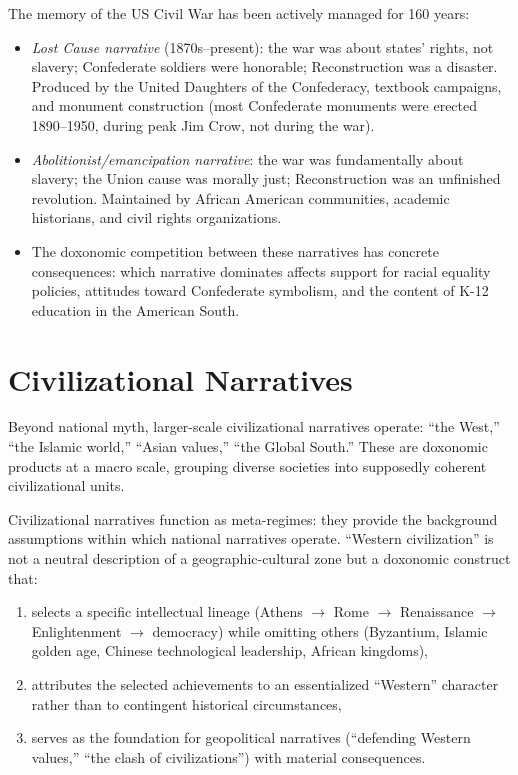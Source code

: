 \begin{example}
\label{ex:memory-contest}
The memory of the US Civil War has been actively managed for 160 years:
\begin{itemize}[nosep]
  \item \emph{Lost Cause narrative} (1870s--present): the war was about states' rights, not slavery; Confederate soldiers were honorable; Reconstruction was a disaster. Produced by the United Daughters of the Confederacy, textbook campaigns, and monument construction (most Confederate monuments were erected 1890--1950, during peak Jim Crow, not during the war).
  \item \emph{Abolitionist/emancipation narrative}: the war was fundamentally about slavery; the Union cause was morally just; Reconstruction was an unfinished revolution. Maintained by African American communities, academic historians, and civil rights organizations.
  \item The doxonomic competition between these narratives has concrete consequences: which narrative dominates affects support for racial equality policies, attitudes toward Confederate symbolism, and the content of K-12 education in the American South.
\end{itemize}
\end{example}

\section{Civilizational Narratives}
\label{sec:ch27-civilization}

Beyond national myth, larger-scale civilizational narratives operate: ``the West,'' ``the Islamic world,'' ``Asian values,'' ``the Global South.''
These are doxonomic products at a macro scale, grouping diverse societies into supposedly coherent civilizational units.

\begin{proposition}
\label{prop:civilizational}
Civilizational narratives function as meta-regimes: they provide the background assumptions within which national narratives operate.
``Western civilization'' is not a neutral description of a geographic-cultural zone but a doxonomic construct that:
\begin{enumerate}[nosep]
  \item selects a specific intellectual lineage (Athens $\to$ Rome $\to$ Renaissance $\to$ Enlightenment $\to$ democracy) while omitting others (Byzantium, Islamic golden age, Chinese technological leadership, African kingdoms),
  \item attributes the selected achievements to an essentialized ``Western'' character rather than to contingent historical circumstances,
  \item serves as the foundation for geopolitical narratives (``defending Western values,'' ``the clash of civilizations'') with material consequences.
\end{enumerate}
\end{proposition}

